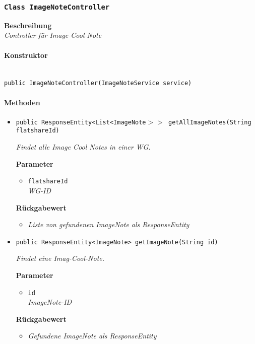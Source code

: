      \subsubsection{\texttt{Class ImageNoteController}}
     \textbf{Beschreibung} \\
     \textit{Controller für Image-Cool-Note}
     \paragraph*{Konstruktor}\mbox{}\\
     \texttt{public ImageNoteController(ImageNoteService service)}
     \paragraph*{Methoden}
     \begin{itemize}
     	\item{\texttt{public ResponseEntity<List<ImageNote$>>$ getAllImageNotes(String flatshareId)}}
     	
     	\textit{Findet alle Image Cool Notes in einer WG.}
     	
     	\textbf{Parameter}
     	\begin{itemize}
     		\item\texttt{flatshareId}\\
     		\textit{WG-ID}  
     	\end{itemize}
     	
     	\textbf{Rückgabewert}
     	\begin{itemize}
     		\item\textit{Liste von gefundenen ImageNote als ResponseEntity} 
     	\end{itemize}
   	
   	\item{\texttt{public ResponseEntity<ImageNote> getImageNote(String id)}}
     	
     	\textit{Findet eine Imag-Cool-Note.}
     	
     	\textbf{Parameter}
     	\begin{itemize}
     		\item\texttt{id}\\
     		\textit{ImageNote-ID}  
     	\end{itemize}
     	
     	\textbf{Rückgabewert}
     	\begin{itemize}
     		\item\textit{Gefundene ImageNote als ResponseEntity} 
     	\end{itemize} 
     

\end{itemize}
